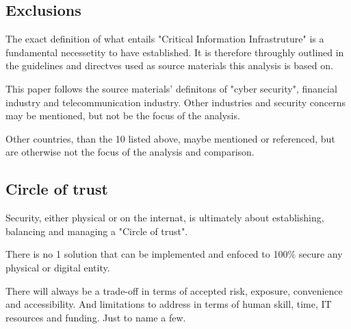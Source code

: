\subsection{Exclusions}

The exact definition of what entails "Critical Information Infrastruture" is a fundamental necessetity to have established. It is therefore throughly outlined in the guidelines and directves used as source materials this analysis is based on.

This paper follows the source materials' definitons of {\emph{}{"cyber security"}}, financial industry and telecommunication industry. Other industries and security concerns may be mentioned, but not be the focus of the analysis.

Other countries, than the 10 listed above, maybe mentioned or referenced, but are otherwise not the focus of the analysis and comparison.

\subsection{Circle of trust}

Security, either physical or on the internat, is ultimately about establishing, balancing and managing a "Circle of trust".

There is no 1 solution that can be implemented and enfoced to 100\% secure any physical or digital entity.

There will always be a trade-off in terms of accepted risk, exposure, convenience and accessibility. And limitations to address in terms of human skill, time, IT resources and funding. Just to name a few.

